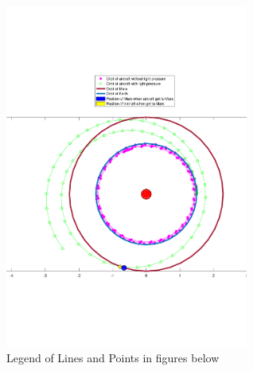 \documentclass[../Paper.tex]{subfiles}
\begin{document}
\begin{figure}[H]
\centering
\includegraphics[width=8cm]{../Figures/label_of_7_orbits.pdf}
\caption{Legend of Lines and Points in figures below}
\end{figure}
\end{document}
